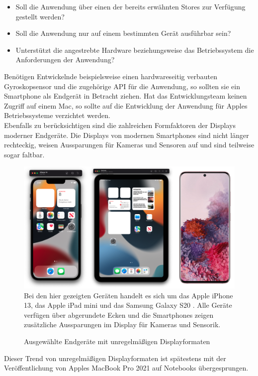 \documentclass[a4paper]{scrartcl}
\begin{document}
\begin{itemize}
	\item Soll die Anwendung über einen der bereits erwähnten Stores zur Verfügung gestellt werden?
	\item Soll die Anwendung nur auf einem bestimmten Gerät ausführbar sein?
	\item Unterstützt die angestrebte Hardware beziehungsweise das Betriebssystem die Anforderungen der Anwendung?
\end{itemize}

Benötigen Entwickelnde beispielsweise einen hardwareseitig verbauten Gyroskopsensor und die zugehörige API für die Anwendung, so sollten sie ein Smartphone als Endgerät in Betracht ziehen. Hat das Entwicklungsteam keinen Zugriff auf einem Mac, so sollte auf die Entwicklung der Anwendung für Apples Betriebssysteme verzichtet werden. \\
Ebenfalls zu berücksichtigen sind die zahlreichen Formfaktoren der Displays moderner Endgeräte. Die Displays von modernen Smartphones sind nicht länger rechteckig, weisen Aussparungen für Kameras und Sensoren auf und sind teilweise sogar faltbar.

\begin{figure}[H]
	\centering
	\caption{Ausgewählte Endgeräte mit unregelmäßigen Displayformaten}
	\includegraphics[scale=0.25]{_assets/phones_displays.png} \\
	Bei den hier gezeigten Geräten handelt es sich um das Apple iPhone 13, das Apple iPad mini und das Samsung Galaxy S20 \autocite{Galaxy_Picture}. Alle Geräte verfügen über abgerundete Ecken und die Smartphones zeigen zusätzliche Aussparungen im Display für Kameras und Sensorik.
\end{figure}

Dieser Trend von unregelmäßigen Displayformaten ist spätestens mit der Veröffentlichung von Apples MacBook Pro 2021 auf Notebooks übergesprungen.
\end{document}
